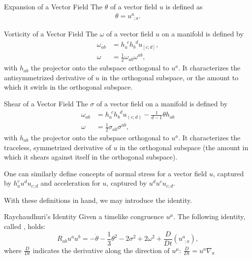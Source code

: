 \begin{definition}{Expansion of a Vector Field}{}
The  \(\theta\) of a vector field \(u\) is defined as
    \begin{align}
        \theta = u^a_{~~;a}
        .
    \end{align}
\end{definition}



\begin{definition}{Vorticity of a Vector Field}{}
The  \(\omega\) of a vector field \(u\) on a manifold is defined by
\begin{align}
    \omega_{ab}&= h_a^{~~c} h_b^{~~d} u_{[c;d]},
    \\
    \omega&=\frac{1}{2}\omega_{ab}\omega^{ab},
\end{align}
with \(h_{ab}\) the projector onto the subspace orthogonal to \(u^a\).
%
It characterizes the antisymmetrized derivative of \(u\) in the orthogonal subspace, or the amount to which it swirls in the orthogonal subspace.
\end{definition}


\begin{definition}{Shear of a Vector Field}{}
The  \(\sigma\) of a vector field on a manifold is defined by 
\begin{align}
    \omega_{ab}
    &=
    h_a^{~~c} h_b^{~~d} u_{(c;d)}
    - \frac{1}{d-1}\theta h_{ab}
    \\
    \omega&=\frac{1}{2}\sigma_{ab}\sigma^{ab}
    ,
\end{align}
with \(h_{ab}\) the projector onto the subspace orthogonal to \(u^a\).
%
It characterizes the traceless, symmetrized derivative of \(u\) in the orthogonal subspace (the amount in which it shears against itself in the orthogonal subspace).
\end{definition}

One can similarly define concepts of normal stress for a vector field \(u\), captured by \(h_a^c u^d u_{c; d}\) and acceleration for \(u\), captured by \(u^d u^c u_{c;d}\).


With these definitions in hand, we may introduce the identity.
 \begin{theorem}{Raychaudhuri's Identity}{}
Given a timelike congruence \(u^\mu\).
%
The following identity, called , holds:
\begin{equation}
    R_{ab} u^a u^b
    =
    -\dot \theta - \frac{1}{3}\theta^2
    - 2\sigma^2 + 2\omega^2 +
    \frac{D}{Dt}\left(u^a_{~~;a}\right)
    ,
\end{equation}
where \(\frac{D}{Dt}\) indicates the derivative along the direction of \(u^\mu\): \(\frac{D}{Dt} = u^a \nabla_a\)
\end{theorem}


